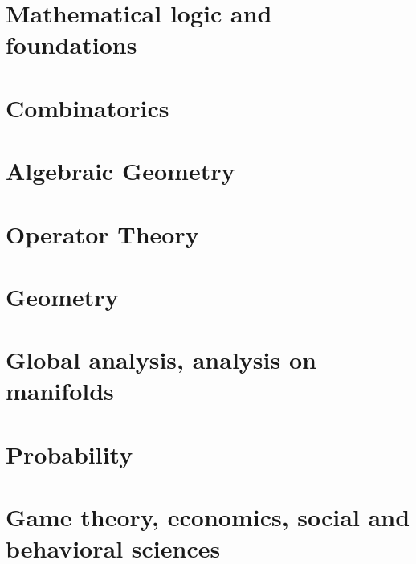 \documentclass[a4paper,10pt]{book}
\begin{document}
  \tableofcontents
	
  
  
  
  \part{Mathematical logic and foundations}
  
  
  \part{Combinatorics}
  

  \part{Algebraic Geometry}
  

  \part{Operator Theory}
  

  \part{Geometry}
  

  \part{Global analysis, analysis on manifolds}  
  
  
  \part{Probability}
  
  
  \part{Game theory, economics, social and behavioral sciences}
  
  
 
  \cleardoublepage
  
  \printbibliography

  
\end{document}
